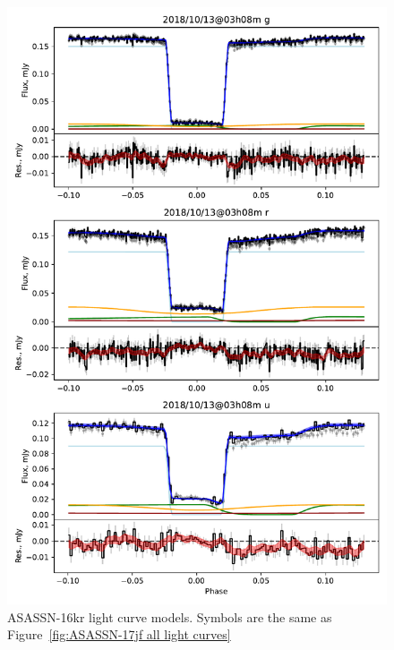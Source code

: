 \begin{figure}
    \centering
    \includegraphics[width=\textwidth]{figures/results/three_cvs_with_weird_colours/ASASSN-16kr/ASASSN-16kr_1.pdf}
    \caption{ASASSN-16kr light curve models. Symbols are the same as Figure~\ref{fig:ASASSN-17jf all light curves}}
    \label{fig:ASASSN-16kr all light curves}
\end{figure}
